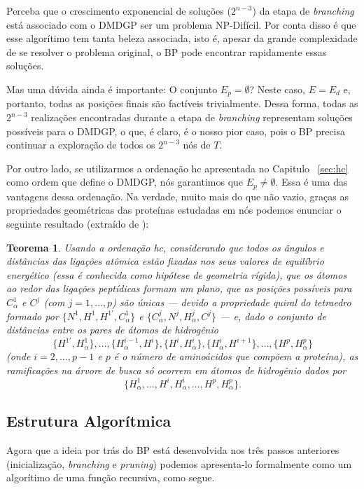 \documentclass[a4paper,12pt]{article}
\newtheorem{teorema}{Teorema}[section]
\begin{document}
	Perceba que o crescimento exponencial de soluções ($2^{n-3}$) da etapa de \textit{branching} está associado com o DMDGP ser um problema NP-Difícil. Por conta disso é que esse algorítimo tem tanta beleza associada, isto é, apesar da grande complexidade de se resolver o problema original, o BP pode encontrar rapidamente essas soluções.

	Mas uma dúvida ainda é importante: O conjunto $E_p = \emptyset$? Neste caso, $E = E_d$ e, portanto, todas as posições finais são factíveis trivialmente. Dessa forma, todas as $2^{n-3}$ realizações encontradas durante a etapa de \textit{branching} representam soluções possíveis para o DMDGP, o que, é claro, é o nosso pior caso, pois o BP precisa continuar a exploração de todos os $2^{n-3}$ nós de $T$. 
	
	Por outro lado, se utilizarmos a ordenação hc apresentada no Capitulo ~\ref{sec:hc} como ordem que define o DMDGP, nós garantimos que $E_p \neq \emptyset$. Essa é uma das vantagens dessa ordenação. Na verdade, muito mais do que não vazio, graças as propriedades geométricas das proteínas estudadas em \cite{carlile:MinimalOrder} nós podemos enunciar o seguinte resultado (extraído de \cite{carlile:MinimalOrder}): 

	\begin{teorema}
		Usando a ordenação hc, considerando que todos os ângulos e distâncias das ligações atômica estão fixadas nos seus valores de equilíbrio energético (essa é conhecida como \textit{hipótese de geometria rígida}), que os átomos ao redor das ligações peptídicas formam um plano, que as posições possíveis para $C_\alpha^1$ e $C^j$ (com $j = 1, \dots,p$) são únicas --- devido a propriedade quiral do tetraedro formado por $\{N^1, H^1, H^{1\prime}, C_\alpha^1\}$ e $\{C_\alpha^j, N^j, H^j_\alpha,C^j\}$ --- e, dado o conjunto de distâncias entre os pares de átomos de hidrogênio
		$$\{H^{1\prime}, H^1_\alpha\}, \dots, \{H_\alpha^{i-1}, H^i\}, \{H^i, H^i_\alpha\}, \{H^i_\alpha, H^{i+1}\}, \dots, \{H^p, H^p_\alpha\}$$
		(onde $i = 2, \dots, p-1$ e $p$ é o número de aminoácidos que compõem a proteína), as ramificações na árvore de busca só ocorrem em átomos de hidrogênio dados por
		$$\{H_\alpha^1, \dots, H^i, H_\alpha^i, \dots, H^p, H_\alpha^p\}.$$	
	\end{teorema}

	\subsection{Estrutura Algorítmica}
	Agora que a ideia por trás do BP está desenvolvida nos três passos anteriores (inicialização, \textit{branching} e \textit{pruning}) podemos apresenta-lo formalmente como um algorítimo de uma função recursiva, como segue.
	\\
	
\end{document}
